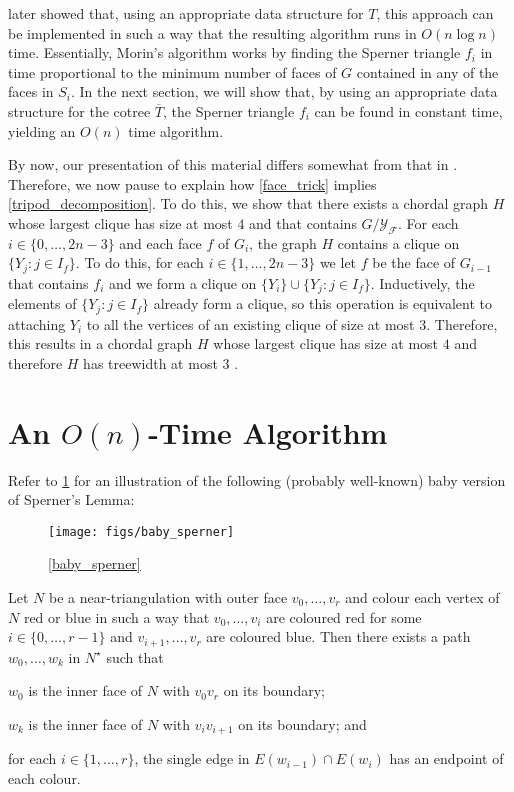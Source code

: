 \documentclass{patmorin}
\begin{document}
\citet{morin:fast} later showed that, using an appropriate data structure for $T$, this approach can be implemented in such a way that the resulting algorithm runs in $O(n\log n)$ time.  Essentially, Morin's algorithm works by finding the Sperner triangle $f_i$ in time proportional to the minimum number of faces of $G$ contained in any of the faces in $S_i$.  In the next section, we will show that, by using an appropriate data structure for the cotree $\overline{T}$, the Sperner triangle $f_i$ can be found in constant time, yielding an $O(n)$ time algorithm.

By now, our presentation of this material differs somewhat from that in \cite{dujmovic.joret.ea:planar,ueckerdt.wood.ea:improved}.  Therefore, we now pause to explain how \cref{face_trick} implies \cref{tripod_decomposition}.  To do this, we show that there exists a chordal graph $H$ whose largest clique has size at most $4$ and that contains $G/\mathcal{Y_F}$. For each $i\in\{0,\ldots,2n-3\}$ and each face $f$ of $G_i$, the graph $H$ contains a clique on $\{Y_j:j\in I_f\}$.  To do this, for each $i\in\{1,\ldots,2n-3\}$ we let $f$ be the face of $G_{i-1}$ that contains $f_i$ and we form a clique on $\{Y_i\}\cup\{Y_j:j\in I_f\}$.  Inductively, the elements of $\{Y_j:j\in I_f\}$ already form a clique, so this operation is equivalent to attaching $Y_i$ to all the vertices of an existing clique of size at most $3$. Therefore, this results in a chordal graph $H$ whose largest clique has size at most $4$ and therefore $H$ has treewidth at most $3$ \cite{gavril:intersection}.

\section{An $O(n)$-Time Algorithm}
\label{linear_time_algorithm}

Refer to \cref{baby_sperner_fig} for an illustration of the following (probably well-known) baby version of Sperner's Lemma:

\begin{figure}
  \begin{center}
    \texttt{[image: figs/baby\_sperner]}
  \end{center}
  \caption{\cref{baby_sperner}}
  \label{baby_sperner_fig}
\end{figure}

\begin{lem}\label{baby_sperner}
  Let $N$ be a near-triangulation with outer face $v_0,\ldots,v_r$ and colour each vertex of $N$ red or blue in such a way that $v_0,\ldots,v_i$ are coloured red for some $i\in\{0,\ldots,r-1\}$ and $v_{i+1},\ldots,v_r$ are coloured blue.  Then there exists a path $w_0,\ldots,w_k$ in $N^\star$ such that
  \begin{compactenum}
    \item $w_0$ is the inner face of $N$ with $v_0v_r$ on its boundary;
    \item $w_k$ is the inner face of $N$ with $v_iv_{i+1}$ on its boundary; and
    \item for each $i\in\{1,\ldots,r\}$, the single edge in $E(w_{i-1})\cap E(w_i)$ has an endpoint of each colour.
  \end{compactenum}
\end{lem}
\end{document}
